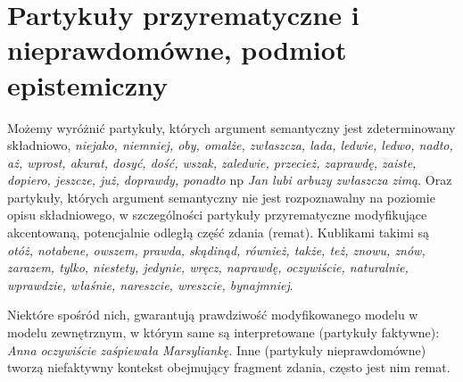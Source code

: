 \documentclass[a4paper,12pt]{article}
\begin{document}

\section{Partykuły przyrematyczne i nieprawdomówne, podmiot epistemiczny}
Możemy wyróżnić partykuły, których argument semantyczny jest zdeterminowany składniowo,
{\it niejako, niemniej, oby, omalże, zwłaszcza, lada, ledwie, ledwo, nadto,
aż, wprost, akurat, dosyć, dość, wszak, zaledwie, przecież, zaprawdę, zaiste,
dopiero, jeszcze, już, doprawdy, ponadto} 
np {\it Jan lubi arbuzy zwłaszcza zimą}.
Oraz partykuły, których argument semantyczny nie jest rozpoznawalny na poziomie 
opisu składniowego, w szczególności partykuły przyrematyczne 
modyfikujące akcentowaną, potencjalnie odległą część zdania (remat).%
Kublikami takimi są {\it otóż, notabene, owszem, prawda, skądinąd,
również, także, też, znowu, znów, zarazem, tylko, niestety, jedynie, wręcz,
naprawdę, oczywiście, naturalnie, wprawdzie, właśnie, nareszcie, wreszcie,
bynajmniej}. 

Niektóre spośród nich, gwarantują prawdziwość modyfikowanego 
modelu w modelu zewnętrznym, w którym same są interpretowane
(partykuły faktywne): %
{\it Anna oczywiście zaśpiewała Marsyliankę.}
Inne (partykuły nieprawdomówne) tworzą niefaktywny kontekst obejmujący fragment zdania,
często jest nim remat.
\end{document}

